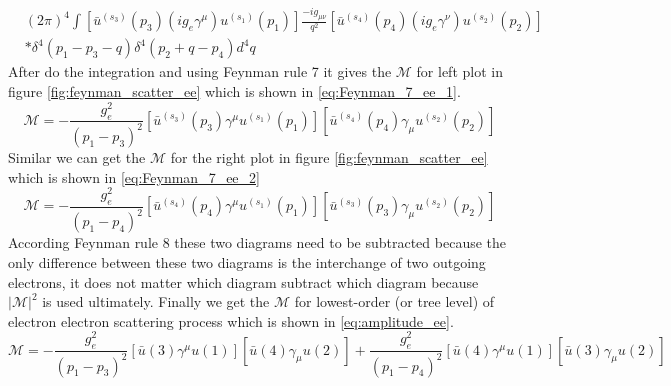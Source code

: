 \begin{equation}
\begin{split}
&(2\pi)^{4}\int[\bar{u}^{(s_{3})}(p_{3})(ig_{e}\gamma^{\mu})u^{(s_{1})}(p_{1})]\frac{-ig_{\mu\nu}}{q^{2}}[\bar{u}^{(s_{4})}(p_{4})(ig_{e}\gamma^{\nu})u^{(s_{2})}(p_{2})] \\
&*\delta^{4}(p_{1}-p_{3}-q)\delta^{4}(p_{2}+q-p_{4})d^{4}q
\end{split}
\label{eq:Feynman_1_6_ee_1}
\end{equation}
After do the integration and using Feynman rule 7 it gives the $\mathcal{M}$ for left plot in figure \ref{fig:feynman_scatter_ee} which is shown in \ref{eq:Feynman_7_ee_1}.
\begin{equation}
\mathcal{M}=-\frac{g_{e}^{2}}{(p_{1}-p_{3})^{2}}[\bar{u}^{(s_{3})}(p_{3})\gamma^{\mu}u^{(s_{1})}(p_{1})][\bar{u}^{(s_{4})}(p_{4})\gamma_{\mu}u^{(s_{2})}(p_{2})]
\label{eq:Feynman_7_ee_1}
\end{equation}
Similar we can get the $\mathcal{M}$ for the right plot in figure \ref{fig:feynman_scatter_ee} which is shown in \ref{eq:Feynman_7_ee_2}
\begin{equation}
\mathcal{M}=-\frac{g_{e}^{2}}{(p_{1}-p_{4})^{2}}[\bar{u}^{(s_{4})}(p_{4})\gamma^{\mu}u^{(s_{1})}(p_{1})][\bar{u}^{(s_{3})}(p_{3})\gamma_{\mu}u^{(s_{2})}(p_{2})]
\label{eq:Feynman_7_ee_2}
\end{equation}
According Feynman rule 8 these two diagrams need to be subtracted because the only difference between these two diagrams is the interchange of two outgoing electrons, it does not matter which diagram subtract which diagram because $|\mathcal{M}|^{2}$ is used ultimately. Finally we get the $\mathcal{M}$ for lowest-order (or tree level) of electron electron scattering process which is shown in \ref{eq:amplitude_ee}.
\begin{equation}
\mathcal{M}=-\frac{g_{e}^{2}}{(p_{1}-p_{3})^{2}}[\bar{u}(3)\gamma^{\mu}u(1)][\bar{u}(4)\gamma_{\mu}u(2)]+\frac{g_{e}^{2}}{(p_{1}-p_{4})^{2}}[\bar{u}(4)\gamma^{\mu}u(1)][\bar{u}(3)\gamma_{\mu}u(2)]
\label{eq:amplitude_ee}
\end{equation}

